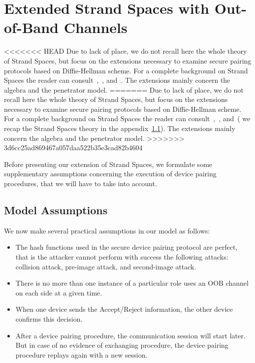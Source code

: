 \section{Extended Strand Spaces with Out-of-Band Channels}\label{extended-strand}

<<<<<<< HEAD
Due to lack of place, we do not recall here the whole theory of Strand Spaces, but focus on the extensions necessary to examine secure pairing protocols based on Diffie-Hellman scheme. For a complete background on Strand Spaces the reader can consult~\cite{674832},~\cite{Guttman:2002:ATS:568264.568267}, and~\cite{1212716}. The extensions mainly concern the algebra and the penetrator model.
=======
Due to lack of place, we do not recall here the whole theory of Strand Spaces, but focus on the extensions necessary to examine secure pairing protocols based on Diffie-Hellman scheme. For a complete background on Strand Spaces the reader can consult~\cite{674832},~\cite{Guttman:2002:ATS:568264.568267}, and~\cite{1212716}( we recap the Strand Spaces theory in the appendix~\ref{}). The extensions mainly concern the algebra and the penetrator model.
>>>>>>> 3d6cc25ad869467a057daa522b35e3cad82b4604

Before presenting our extension of Strand Spaces, we formulate some supplementary assumptions concerning the execution of device pairing procedures, that we will have to take into account.
 
\subsection{Model Assumptions}

We now make several practical assumptions in our model as follows: 
\begin{itemize}
\item The hash functions used in the secure device pairing protocol are perfect, that is the attacker cannot perform with success the following attacks: collision attack, pre-image attack, and second-image attack.
\item There is no more than one instance of a particular role uses an OOB channel on each side at a given time.
\item When one device sends the Accept/Reject information, the other device confirms this decision.
\item After a device pairing procedure, the communication session will start later. But in case of no evidence of exchanging procedure, the device pairing procedure replays again with a new session. 
\end{itemize} 

